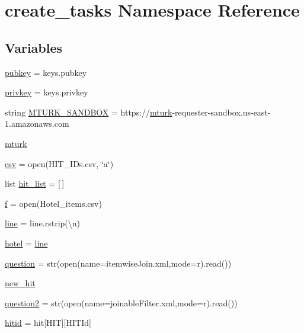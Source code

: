 \hypertarget{namespacecreate__tasks}{}\section{create\+\_\+tasks Namespace Reference}
\label{namespacecreate__tasks}
\subsection*{Variables}
\begin{DoxyCompactItemize}
\item 
\mbox{\hyperlink{namespacecreate__tasks_a472244c9add0e4115ce313312dde7224}{pubkey}} = keys.\+pubkey
\item 
\mbox{\hyperlink{namespacecreate__tasks_ae5335a2167ab5606ba0586b71c1bbf8c}{privkey}} = keys.\+privkey
\item 
string \mbox{\hyperlink{namespacecreate__tasks_ae62b2c698fe34f48fcc67433b6495a00}{M\+T\+U\+R\+K\+\_\+\+S\+A\+N\+D\+B\+OX}} = \textquotesingle{}https\+://\mbox{\hyperlink{namespacecreate__tasks_a5d236ec2d0fb7be80dec953c4f7564d7}{mturk}}-\/requester-\/sandbox.\+us-\/east-\/1.amazonaws.\+com\textquotesingle{}
\item 
\mbox{\hyperlink{namespacecreate__tasks_a5d236ec2d0fb7be80dec953c4f7564d7}{mturk}}
\item 
\mbox{\hyperlink{namespacecreate__tasks_a8c4ebdc20b35d7f4ede09b2cc3b26db0}{csv}} = open(\textquotesingle{}H\+I\+T\+\_\+\+I\+Ds.\+csv\textquotesingle{}, \char`\"{}a\char`\"{})
\item 
list \mbox{\hyperlink{namespacecreate__tasks_af544d924d0a234c5b2117297adfe52d4}{hit\+\_\+list}} = \mbox{[}$\,$\mbox{]}
\item 
\mbox{\hyperlink{namespacecreate__tasks_a633de4b0c14ca52ea2432a3c8a5c4c31}{f}} = open(\textquotesingle{}Hotel\+\_\+items.\+csv\textquotesingle{})
\item 
\mbox{\hyperlink{namespacecreate__tasks_a4fa05b1f00fcde100685cc887554b93b}{line}} = line.\+rstrip(\textquotesingle{}\textbackslash{}n\textquotesingle{})
\item 
\mbox{\hyperlink{namespacecreate__tasks_a14bfea709a79fbd8d11cc6f56496c6c6}{hotel}} = \mbox{\hyperlink{namespacecreate__tasks_a4fa05b1f00fcde100685cc887554b93b}{line}}
\item 
\mbox{\hyperlink{namespacecreate__tasks_a1a1b6bd27a93f9139a2f44d01f7b3ad1}{question}} = str(open(name=\textquotesingle{}itemwise\+Join.\+xml\textquotesingle{},mode=\textquotesingle{}r\textquotesingle{}).read())
\item 
\mbox{\hyperlink{namespacecreate__tasks_ae1d9786f8e61a0b5b2060dfc938cad0a}{new\+\_\+hit}}
\item 
\mbox{\hyperlink{namespacecreate__tasks_a2abfda5d0d7716cccbef2ea0b8b6374f}{question2}} = str(open(name=\textquotesingle{}joinable\+Filter.\+xml\textquotesingle{},mode=\textquotesingle{}r\textquotesingle{}).read())
\item 
\mbox{\hyperlink{namespacecreate__tasks_ab336a8ed61089061c8238edccfd7534e}{hitid}} = hit\mbox{[}\textquotesingle{}H\+IT\textquotesingle{}\mbox{]}\mbox{[}\textquotesingle{}H\+I\+T\+Id\textquotesingle{}\mbox{]}
\end{DoxyCompactItemize}


